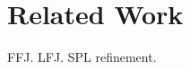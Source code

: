 \section{Related Work}\label{seq:related}
FFJ\cite{prehofer_feature-oriented_1997}. LFJ\cite{delaware_machine-checked_2009}. SPL refinement\cite{ferreira_making_2012}.
